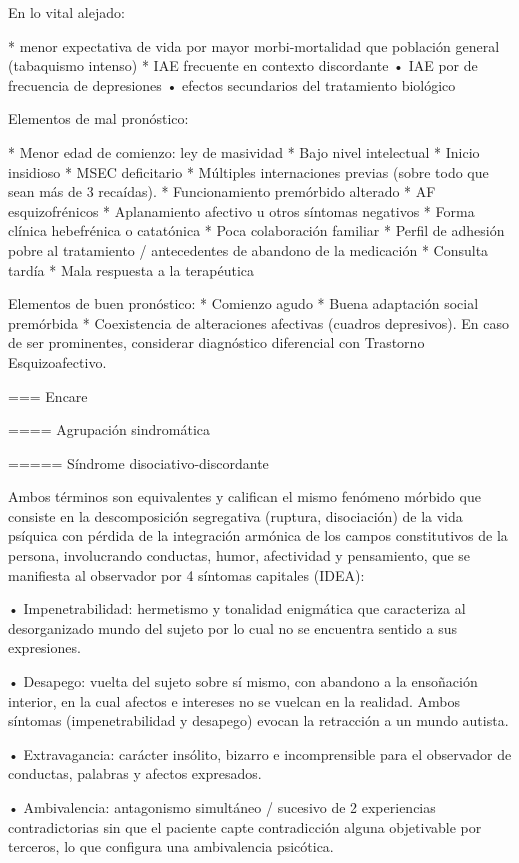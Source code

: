 \documentclass[encares.tex]{subfiles}
\begin{document}
En lo vital alejado:

* menor expectativa de vida por mayor morbi-mortalidad que población general (tabaquismo intenso)
* IAE frecuente en contexto discordante • IAE por de frecuencia de depresiones • efectos secundarios del tratamiento biológico

Elementos de mal pronóstico:

* Menor edad de comienzo: ley de masividad
* Bajo nivel intelectual
* Inicio insidioso
* MSEC deficitario
* Múltiples internaciones previas (sobre todo que sean más de 3 recaídas).
* Funcionamiento premórbido alterado
* AF esquizofrénicos
* Aplanamiento afectivo u otros síntomas negativos
* Forma clínica hebefrénica o catatónica
* Poca colaboración familiar
* Perfil de adhesión pobre al tratamiento / antecedentes de abandono de la medicación
* Consulta tardía
* Mala respuesta a la terapéutica

Elementos de buen pronóstico:
* Comienzo agudo
* Buena adaptación social premórbida
* Coexistencia de alteraciones afectivas (cuadros depresivos). En caso de ser prominentes, considerar diagnóstico diferencial con Trastorno Esquizoafectivo.

=== Encare

==== Agrupación sindromática

===== Síndrome disociativo-discordante

Ambos términos son equivalentes y califican el mismo fenómeno mórbido que consiste en la descomposición segregativa (ruptura, disociación) de la vida psíquica con pérdida de la integración armónica de los campos constitutivos de la persona, involucrando conductas, humor, afectividad y pensamiento, que se manifiesta al observador por 4 síntomas capitales (IDEA):

• Impenetrabilidad: hermetismo y tonalidad enigmática que caracteriza al desorganizado mundo del sujeto por lo cual no se encuentra sentido a sus expresiones.

• Desapego: vuelta del sujeto sobre sí mismo, con abandono a la ensoñación interior, en la cual afectos e intereses no se vuelcan en la realidad. Ambos síntomas (impenetrabilidad y desapego) evocan la retracción a un mundo autista.

• Extravagancia: carácter insólito, bizarro e incomprensible para el observador de conductas, palabras y afectos expresados.

• Ambivalencia: antagonismo simultáneo / sucesivo de 2 experiencias contradictorias sin que el paciente capte contradicción alguna objetivable por terceros, lo que configura una ambivalencia psicótica.
\end{document}
